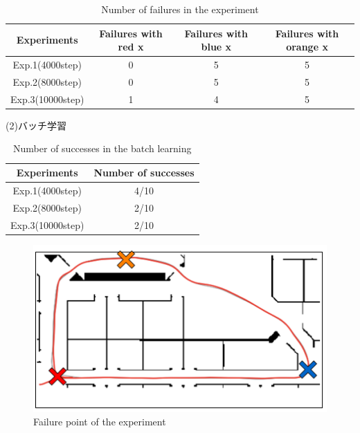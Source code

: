 \begin{table}[h]
  \centering
  \begin{tabular}{|c|c|c|c|} \hline
    Experiments & Failures with red x & Failures with blue x & Failures with orange x\\ \hline
    Exp.1(4000step) & 0 & 5 & 5 \\ \hline
    Exp.2(8000step) & 0 & 5 & 5 \\ \hline
    Exp.3(10000step) & 1 & 4 & 5 \\ \hline
  \end{tabular}
  \caption{Number of failures in the experiment}
  \label{tb:fail1.1}
\end{table}

\newpage
\begin{description}
  \item [(2)バッチ学習]
\end{description}

\begin{table}[h]
  \centering
  \begin{tabular}{|c|c|} \hline
    Experiments & Number of successes \\ \hline
    Exp.1(4000step) & 4/10 \\ \hline
    Exp.2(8000step) & 2/10 \\ \hline
    Exp.3(10000step) & 2/10 \\ \hline
  \end{tabular}
  \caption{Number of successes in the batch learning}
  \label{tb:exp1.2}
\end{table}

\begin{figure}[h]
  \centering
  \includegraphics[keepaspectratio, scale=0.5]{images/result1.2.png}
  \caption{Failure point of the experiment}
  \label{Fig:result1.2}
  \end{figure}

